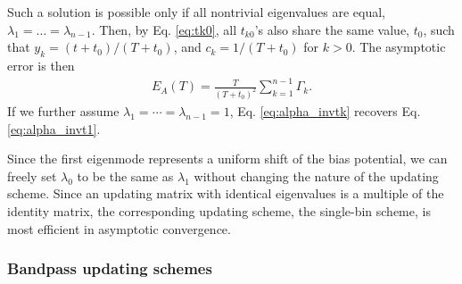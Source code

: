 \documentclass[reprint, superscriptaddress, floatfix]{revtex4-1}
\newcommand{\Err}{E}
\begin{document}
%
Such a solution is possible only if
all nontrivial eigenvalues are equal,
%
  $\lambda_1 = \dots = \lambda_{n-1}$.
%
Then, by Eq. \eqref{eq:tk0},
all $t_{k0}$'s also share the same value,
$t_0$,
such that
$y_k = (t + t_0) / (T + t_0)$,
and
$c_k = 1/(T + t_0)$
for $k > 0$.
%
The asymptotic error is then
%
\begin{align}
  \Err_A(T)
  =
  \frac{       T     }
       { (T + t_0)^2 }
  \sum_{ k = 1 }^{n-1}
    \Gamma_k
  .
\label{eq:error_asym_singlebin}
\end{align}
%
If we further assume $\lambda_1 = \cdots = \lambda_{n-1} = 1$,
Eq. \eqref{eq:alpha_invtk}
recovers Eq. \eqref{eq:alpha_invt1}.
%

Since the first eigenmode represents
a uniform shift of the bias potential,
we can freely set $\lambda_0$ to be the same as $\lambda_1$
without changing the nature of the updating scheme.
%
Since an updating matrix
with identical eigenvalues
is a multiple of the identity matrix,
%
the corresponding updating scheme,
the single-bin scheme, is most efficient
in asymptotic convergence.
%



\subsubsection{\label{sec:optscheme}
Bandpass updating schemes}
\end{document}
